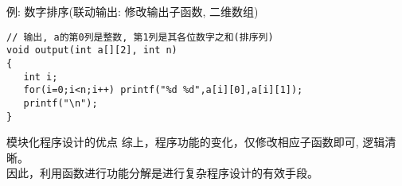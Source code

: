 \begin{frame}{例: 数字排序(联动输出: 修改输出子函数, 二维数组)}
\begin{lstlisting}
// 输出, a的第0列是整数, 第1列是其各位数字之和(排序列)
void output(int a[][2], int n)
{
   int i;
   for(i=0;i<n;i++) printf("%d %d",a[i][0],a[i][1]);
   printf("\n");
}
\end{lstlisting}

\begin{block}{模块化程序设计的优点}
	综上，程序功能的变化，仅修改相应子函数即可, 逻辑清晰。\\
	因此，利用函数进行功能分解是进行复杂程序设计的有效手段。
\end{block}
\end{frame}






